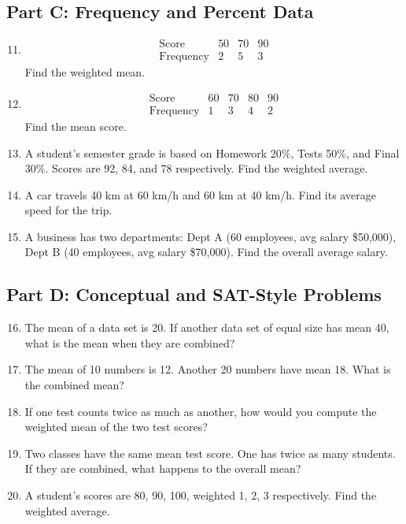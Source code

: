 \documentclass[12pt]{article}
\begin{document}
\subsection*{Part C: Frequency and Percent Data}
\begin{enumerate}
  \setcounter{enumi}{10}
  \item 
  \[
  \begin{array}{c|ccc}
  \text{Score} & 50 & 70 & 90\\ \hline
  \text{Frequency} & 2 & 5 & 3
  \end{array}
  \]
  Find the weighted mean.

  \item 
  \[
  \begin{array}{c|cccc}
  \text{Score} & 60 & 70 & 80 & 90\\ \hline
  \text{Frequency} & 1 & 3 & 4 & 2
  \end{array}
  \]
  Find the mean score.

  \item A student’s semester grade is based on Homework 20\%, Tests 50\%, and Final 30\%. Scores are 92, 84, and 78 respectively. Find the weighted average.
  \item A car travels 40 km at 60 km/h and 60 km at 40 km/h. Find its average speed for the trip.
  \item A business has two departments: Dept A (60 employees, avg salary \$50,000), Dept B (40 employees, avg salary \$70,000). Find the overall average salary.
\end{enumerate}

\subsection*{Part D: Conceptual and SAT-Style Problems}
\begin{enumerate}
  \setcounter{enumi}{15}
  \item The mean of a data set is 20. If another data set of equal size has mean 40, what is the mean when they are combined?
  \item The mean of 10 numbers is 12. Another 20 numbers have mean 18. What is the combined mean?
  \item If one test counts twice as much as another, how would you compute the weighted mean of the two test scores?
  \item Two classes have the same mean test score. One has twice as many students. If they are combined, what happens to the overall mean?
  \item A student’s scores are 80, 90, 100, weighted 1, 2, 3 respectively. Find the weighted average.
\end{enumerate}
\end{document}
